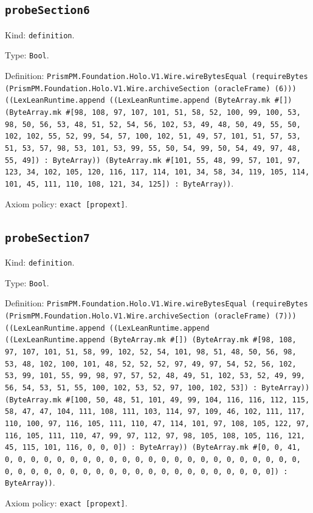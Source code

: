 \documentclass[11pt]{article}
\begin{document}
\subsection*{\texttt{probeSection6}}
\noindent Kind: \texttt{definition}.\par
\noindent Type: \texttt{Bool}.\par
\noindent Definition: \texttt{PrismPM.Foundation.Holo.V1.Wire.wireBytesEqual (requireBytes (PrismPM.Foundation.Holo.V1.Wire.archiveSection (oracleFrame) (6))) ((LexLeanRuntime.append ((LexLeanRuntime.append (ByteArray.mk \#[]) (ByteArray.mk \#[98, 108, 97, 107, 101, 51, 58, 52, 100, 99, 100, 53, 98, 50, 56, 53, 48, 51, 52, 54, 56, 102, 53, 49, 48, 50, 49, 55, 50, 102, 102, 55, 52, 99, 54, 57, 100, 102, 51, 49, 57, 101, 51, 57, 53, 51, 53, 57, 98, 53, 101, 53, 99, 55, 50, 54, 99, 50, 54, 49, 97, 48, 55, 49]) : ByteArray)) (ByteArray.mk \#[101, 55, 48, 99, 57, 101, 97, 123, 34, 102, 105, 120, 116, 117, 114, 101, 34, 58, 34, 119, 105, 114, 101, 45, 111, 110, 108, 121, 34, 125]) : ByteArray))}.\par
\noindent Axiom policy: \texttt{exact [propext]}.\par
\subsection*{\texttt{probeSection7}}
\noindent Kind: \texttt{definition}.\par
\noindent Type: \texttt{Bool}.\par
\noindent Definition: \texttt{PrismPM.Foundation.Holo.V1.Wire.wireBytesEqual (requireBytes (PrismPM.Foundation.Holo.V1.Wire.archiveSection (oracleFrame) (7))) ((LexLeanRuntime.append ((LexLeanRuntime.append ((LexLeanRuntime.append (ByteArray.mk \#[]) (ByteArray.mk \#[98, 108, 97, 107, 101, 51, 58, 99, 102, 52, 54, 101, 98, 51, 48, 50, 56, 98, 53, 48, 102, 100, 101, 48, 52, 52, 52, 97, 49, 97, 54, 52, 56, 102, 53, 99, 101, 55, 99, 98, 97, 57, 52, 48, 49, 51, 102, 53, 52, 49, 99, 56, 54, 53, 51, 55, 100, 102, 53, 52, 97, 100, 102, 53]) : ByteArray)) (ByteArray.mk \#[100, 50, 48, 51, 101, 49, 99, 104, 116, 116, 112, 115, 58, 47, 47, 104, 111, 108, 111, 103, 114, 97, 109, 46, 102, 111, 117, 110, 100, 97, 116, 105, 111, 110, 47, 114, 101, 97, 108, 105, 122, 97, 116, 105, 111, 110, 47, 99, 97, 112, 97, 98, 105, 108, 105, 116, 121, 45, 115, 101, 116, 0, 0, 0]) : ByteArray)) (ByteArray.mk \#[0, 0, 41, 0, 0, 0, 0, 0, 0, 0, 0, 0, 0, 0, 0, 0, 0, 0, 0, 0, 0, 0, 0, 0, 0, 0, 0, 0, 0, 0, 0, 0, 0, 0, 0, 0, 0, 0, 0, 0, 0, 0, 0, 0, 0, 0, 0]) : ByteArray))}.\par
\noindent Axiom policy: \texttt{exact [propext]}.\par
\end{document}

